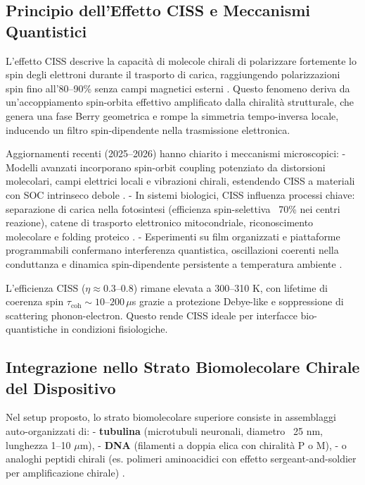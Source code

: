 \documentclass[11pt,a4paper]{article}
\let\oldcite\cite
\renewcommand{\cite}{\protect\oldcite}
\theoremstyle{plain}
\theoremstyle{definition}
\begin{document}
\vspace{0.3cm}

\subsection{Principio dell'Effetto CISS e Meccanismi Quantistici}

L'effetto CISS descrive la capacità di molecole chirali di polarizzare fortemente lo spin degli elettroni durante il trasporto di carica, raggiungendo polarizzazioni spin fino all'80–90\% senza campi magnetici esterni \cite{naaman2019spin, miwa2025spin}. Questo fenomeno deriva da un'accoppiamento spin-orbita effettivo amplificato dalla chiralità strutturale, che genera una fase Berry geometrica e rompe la simmetria tempo-inversa locale, inducendo un filtro spin-dipendente nella trasmissione elettronica.

Aggiornamenti recenti (2025–2026) hanno chiarito i meccanismi microscopici:
- Modelli avanzati incorporano spin-orbit coupling potenziato da distorsioni molecolari, campi elettrici locali e vibrazioni chirali, estendendo CISS a materiali con SOC intrinseco debole \cite{sala2026spin, rohmer2025chiral}.
- In sistemi biologici, CISS influenza processi chiave: separazione di carica nella fotosintesi (efficienza spin-selettiva ~70\% nei centri reazione), catene di trasporto elettronico mitocondriale, riconoscimento molecolare e folding proteico \cite{kumar2026chirality, levy2025quantum}.
- Esperimenti su film organizzati e piattaforme programmabili confermano interferenza quantistica, oscillazioni coerenti nella conduttanza e dinamica spin-dipendente persistente a temperatura ambiente \cite{eckelmann2023chiral, dong2025chirality}.

L'efficienza CISS ($\eta \approx 0.3$–$0.8$) rimane elevata a 300–310 K, con lifetime di coerenza spin $\tau_{\mathrm{coh}} \sim 10$–$200\,\mu$s grazie a protezione Debye-like e soppressione di scattering phonon-electron. Questo rende CISS ideale per interfacce bio-quantistiche in condizioni fisiologiche.



\vspace{0.3cm}

\subsection{Integrazione nello Strato Biomolecolare Chirale del Dispositivo}

Nel setup proposto, lo strato biomolecolare superiore consiste in assemblaggi auto-organizzati di:
- \textbf{tubulina} (microtubuli neuronali, diametro ~25 nm, lunghezza 1–10 $\mu$m),
- \textbf{DNA} (filamenti a doppia elica con chiralità P o M),
- o analoghi peptidi chirali (es. polimeri aminoacidici con effetto sergeant-and-soldier per amplificazione chirale) \cite{rohmer2025chiral}.
\end{document}
